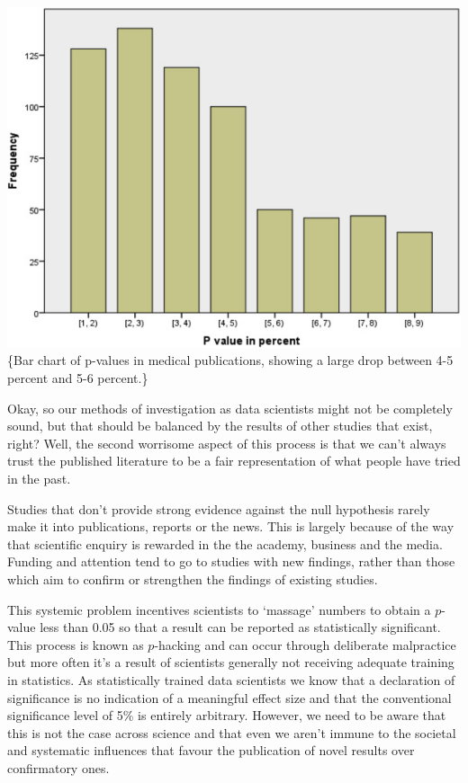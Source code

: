\documentclass[
  letterpaper,
  DIV=11,
  numbers=noendperiod]{scrreprt}
\begin{document}
\includegraphics{images/401-production-reproducibility/p-values-in-medical-papers.jpg}\{Bar
chart of p-values in medical publications, showing a large drop between
4-5 percent and 5-6 percent.\}

Okay, so our methods of investigation as data scientists might not be
completely sound, but that should be balanced by the results of other
studies that exist, right? Well, the second worrisome aspect of this
process is that we can't always trust the published literature to be a
fair representation of what people have tried in the past.

Studies that don't provide strong evidence against the null hypothesis
rarely make it into publications, reports or the news. This is largely
because of the way that scientific enquiry is rewarded in the the
academy, business and the media. Funding and attention tend to go to
studies with new findings, rather than those which aim to confirm or
strengthen the findings of existing studies.

This systemic problem incentives scientists to `massage' numbers to
obtain a \(p\)-value less than 0.05 so that a result can be reported as
statistically significant. This process is known as \(p\)-hacking and
can occur through deliberate malpractice but more often it's a result of
scientists generally not receiving adequate training in statistics. As
statistically trained data scientists we know that a declaration of
significance is no indication of a meaningful effect size and that the
conventional significance level of 5\% is entirely arbitrary. However,
we need to be aware that this is not the case across science and that
even we aren't immune to the societal and systematic influences that
favour the publication of novel results over confirmatory ones.
\end{document}
